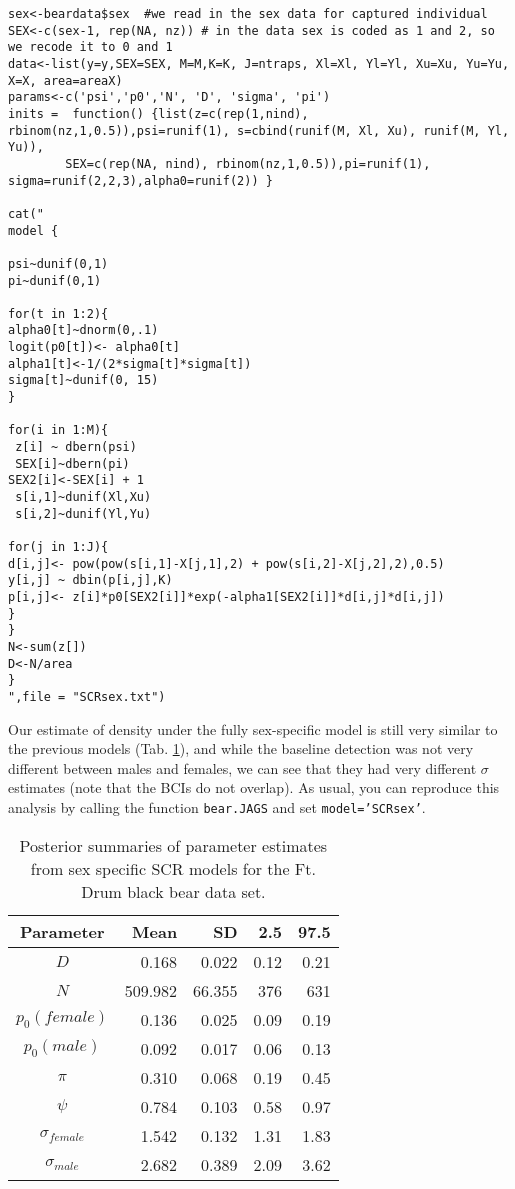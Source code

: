 {\small
\begin{verbatim}
sex<-beardata$sex  #we read in the sex data for captured individual
SEX<-c(sex-1, rep(NA, nz)) # in the data sex is coded as 1 and 2, so we recode it to 0 and 1
data<-list(y=y,SEX=SEX, M=M,K=K, J=ntraps, Xl=Xl, Yl=Yl, Xu=Xu, Yu=Yu, X=X, area=areaX)
params<-c('psi','p0','N', 'D', 'sigma', 'pi')
inits =  function() {list(z=c(rep(1,nind), rbinom(nz,1,0.5)),psi=runif(1), s=cbind(runif(M, Xl, Xu), runif(M, Yl, Yu)), 
		SEX=c(rep(NA, nind), rbinom(nz,1,0.5)),pi=runif(1), sigma=runif(2,2,3),alpha0=runif(2)) }

cat("
model {

psi~dunif(0,1)
pi~dunif(0,1)

for(t in 1:2){
alpha0[t]~dnorm(0,.1)
logit(p0[t])<- alpha0[t]
alpha1[t]<-1/(2*sigma[t]*sigma[t])
sigma[t]~dunif(0, 15)
}

for(i in 1:M){
 z[i] ~ dbern(psi)
 SEX[i]~dbern(pi)
SEX2[i]<-SEX[i] + 1
 s[i,1]~dunif(Xl,Xu)
 s[i,2]~dunif(Yl,Yu)

for(j in 1:J){
d[i,j]<- pow(pow(s[i,1]-X[j,1],2) + pow(s[i,2]-X[j,2],2),0.5)
y[i,j] ~ dbin(p[i,j],K)
p[i,j]<- z[i]*p0[SEX2[i]]*exp(-alpha1[SEX2[i]]*d[i,j]*d[i,j])
}
}
N<-sum(z[])
D<-N/area
}
",file = "SCRsex.txt")
\end{verbatim}
}


Our estimate of density under the fully sex-specific model is still
very similar to the previous models (Tab.
\ref{covariates.tab.SCRsex}), and while the baseline detection was not
very different between males and females, we can see that they had
very different $\sigma$ estimates (note that the BCIs do not overlap).
As usual, you can reproduce this analysis by calling the function 
{\tt bear.JAGS} and set {\tt model='SCRsex'}.

\begin{table}[ht]
\centering
\caption{Posterior summaries of parameter estimates from sex specific SCR models for the Ft. Drum black bear data set.}
\begin{tabular}{crrrr}
\hline
Parameter & Mean & SD & 2.5 & 97.5 \\
\hline
$D$  &     0.168 & 0.022 & 0.12 & 0.21  \\
$N$   &   509.982 & 66.355 & 376 & 631 \\
$p_0 (female)$ & 0.136 & 0.025 & 0.09 & 0.19 \\
$p_0 (male)$ & 0.092 & 0.017 & 0.06 & 0.13 \\
$\pi$ &  0.310 & 0.068 & 0.19 & 0.45 \\
$\psi$  & 0.784 & 0.103 & 0.58 & 0.97 \\
$\sigma_{female}$ & 1.542 &  0.132 & 1.31 & 1.83 \\
$\sigma_{male}$ & 2.682 & 0.389 & 2.09 & 3.62 \\
\end{tabular}
\label{covariates.tab.SCRsex}
\end{table}




